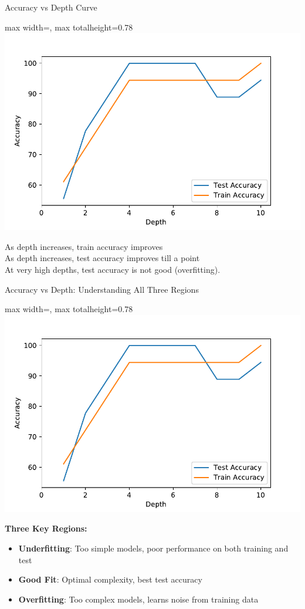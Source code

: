 \documentclass[aspectratio=169,10pt]{beamer}
\newcommand{\fitpic}[1]{\begin{adjustbox}{max width=\linewidth, max totalheight=0.78\textheight}#1\end{adjustbox}}
\begin{document}
	\begin{frame}{Accuracy vs Depth Curve}
		\begin{center}
		\fitpic{\includegraphics[scale=0.55]{acc-depth-plot}}
	\end{center}
	\pause As depth increases, train accuracy improves\\
	\pause As depth increases, test accuracy improves till a point\\
	\pause At very high depths, test accuracy is not good (overfitting). 

	\end{frame}

	\begin{frame}{Accuracy vs Depth: Understanding All Three Regions}
	\begin{center}
	\fitpic{\includegraphics[scale=0.5]{acc-depth-plot}}
	\end{center}
	
	\begin{keypointsbox}
	\textbf{Three Key Regions:}
	\begin{itemize}
	\item \textbf{Underfitting}: Too simple models, poor performance on both training and test
	\item \textbf{Good Fit}: Optimal complexity, best test accuracy
	\item \textbf{Overfitting}: Too complex models, learns noise from training data
	\end{itemize}
	\end{keypointsbox}
	\end{frame}
\end{document}
